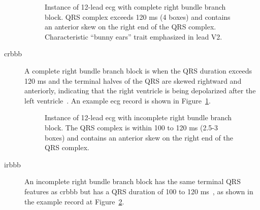 \documentclass[\main/thesis.tex]{subfiles}
\begin{document}
\begin{description}
    \begin{figure}[H]
        \centering
        \caption{Instance of 12-lead \gls{ecg} with complete right bundle branch block. QRS complex exceeds 120 ms (4 boxes) and contains an anterior skew on the right end of the QRS complex. Characteristic ``bunny ears'' trait emphasized in lead V2.}
        \label{fig:full_CRBBB}
    \end{figure} 
    \item[\gls{crbbb}] A complete right bundle branch block is when the QRS duration exceeds 120 ms and the terminal halves of the QRS are skewed rightward and anteriorly, indicating that the right ventricle is being depolarized after the left ventricle~\cite{ecg-utah-lesson}. An example \gls{ecg} record is shown in Figure~\ref{fig:full_CRBBB}.

    \begin{figure}[H]
        \centering
        \caption{Instance of 12-lead \gls{ecg} with incomplete right bundle branch block. The QRS complex is within 100 to 120 ms (2.5-3 boxes) and contains an anterior skew on the right end of the QRS complex.}
        \label{fig:full_IRBBB}
    \end{figure} 
    \item[\gls{irbbb}] An incomplete right bundle branch block has the same terminal QRS features as \gls{crbbb} but has a QRS duration of 100 to 120 ms~\cite{ecg-utah-lesson}, as shown in the example record at Figure~\ref{fig:full_IRBBB}.


\end{description}
\end{document}
